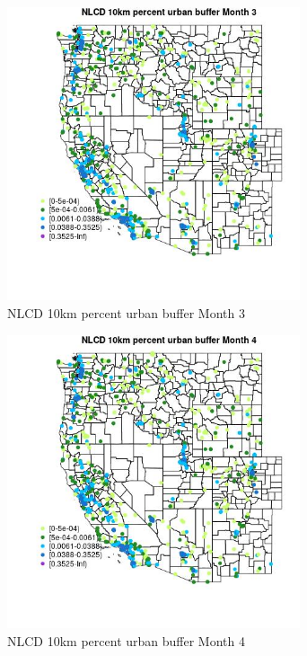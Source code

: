 \begin{figure} 
\centering  
\includegraphics[width=0.77\textwidth]{Code_Outputs/Report_ML_input_PM25_Step4_part_f_de_duplicated_aveswNAs_MapObsMo3NLCD_10km_percent_urban_buffer.jpg} 
\caption{\label{fig:Report_ML_input_PM25_Step4_part_f_de_duplicated_aveswNAsMapObsMo3NLCD_10km_percent_urban_buffer}NLCD 10km percent urban buffer Month 3} 
\end{figure} 
 

\begin{figure} 
\centering  
\includegraphics[width=0.77\textwidth]{Code_Outputs/Report_ML_input_PM25_Step4_part_f_de_duplicated_aveswNAs_MapObsMo4NLCD_10km_percent_urban_buffer.jpg} 
\caption{\label{fig:Report_ML_input_PM25_Step4_part_f_de_duplicated_aveswNAsMapObsMo4NLCD_10km_percent_urban_buffer}NLCD 10km percent urban buffer Month 4} 
\end{figure} 
 


